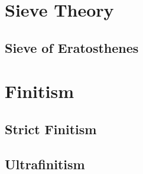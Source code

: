 \section{Sieve Theory}\label{sec:sieve_theory}

\subsection{Sieve of Eratosthenes}\label{sec:sieve}



\section{Finitism}\label{sec:finitism}

\subsection{Strict Finitism}\label{sec:strict_finitism}

\subsection{Ultrafinitism}\label{sec:ultrafinitism}
